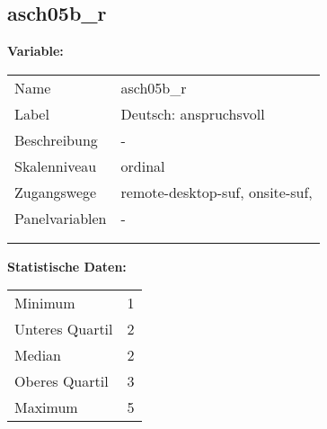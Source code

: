 	
	
	\subsection{asch05b\_r}
	\label{subSection:asch05b_r}

	\noindent\textbf{Variable:}\\
		\begin{tabular}{lL{11.3cm}}
			\label{tableVariable:asch05b_r}
			Name & asch05b\_r \\
			Label & Deutsch: anspruchsvoll \\
			Beschreibung & - \\
			Skalenniveau & ordinal \\
			Zugangswege &
				remote-desktop-suf,
				onsite-suf,
 \\
			Panelvariablen & -
			 \\
			 \\
 \\
		\end{tabular}



		\vspace*{1 cm}
		\noindent\textbf{Statistische Daten:}\\
			\begin{tabular}{ll}
				\label{tableStatistics:asch05b_r}
					Minimum & 1 \\
					Unteres Quartil & 2 \\
					Median & 2 \\
					Oberes Quartil & 3 \\
					Maximum & 5 \\
			\end{tabular}



